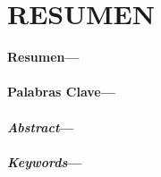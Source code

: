 \section*{RESUMEN}
\vspace{0.5cm}
\noindent \textbf{Resumen---}\resumen \ \\
\ \\
\noindent \textbf{Palabras Clave---}\palabrasclave \ \\
\noindent {\fontsize{16}{19}\selectfont \ \\ \ \\}
\vspace{1.4cm}
\\
\noindent \textbf{\emph{Abstract}---}\resumeningles \ \\
\ \\
\noindent \textbf{\emph{Keywords}---}\palabrasclaveingles \ \\

